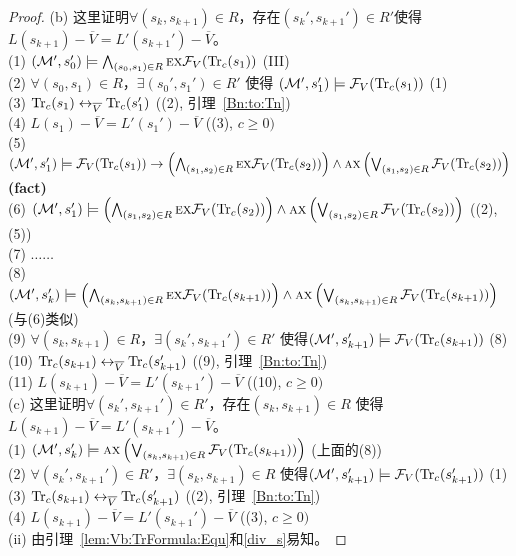 \begin{proof}
	(b) 这里证明$\forall (s_k, s_{k+1}) \in R$，存在$(s_k', s_{k+1}') \in R'$使得$L(s_{k+1}) - \overline V = L'(s_{k+1}') - \overline V$。\\
	(1) $({\cal M}', s_0') \models \bigwedge_{(s_0, s_1) \in R} \textsc{e} \textsc{x} {\cal F}_V(\textrm{Tr}_c(s_1))$  \hfill  (III)\\
	(2) $\forall (s_0, s_1) \in R$，$\exists (s_0', s_1') \in R'$ 使得 $({\cal M}', s_1') \models {\cal F}_V(\textrm{Tr}_c(s_1))$  \hfill  (1)\\
	(3) $\textrm{Tr}_c(s_1) \leftrightarrow_{\overline V} \textrm{Tr}_c(s_1')$  \hfill  ((2), 引理~\ref{Bn:to:Tn}) \\
	(4) $L(s_1) - \overline V = L'(s_1') - \overline V$  \hfill   ((3), $c \geq 0)$\\
	(5) $({\cal M}', s_1') \models {\cal F}_V(\textrm{Tr}_c(s_1)) \rightarrow \left(\bigwedge_{(s_1,s_2)\in R} \textsc{e} \textsc{x} {\cal F}_V(\textrm{Tr}_c(s_2))\right) \wedge \textsc{a} \textsc{x} \left(\bigvee_{(s_1,s_2)\in R} {\cal F}_V(\textrm{Tr}_c(s_2))\right)$     \hfill  \textbf{(fact)}\\
	(6) $({\cal M}', s_1') \models \left(\bigwedge_{(s_1,s_2)\in R} \textsc{e} \textsc{x} {\cal F}_V(\textrm{Tr}_c(s_2))\right) \wedge \textsc{a} \textsc{x} \left(\bigvee_{(s_1,s_2)\in R} {\cal F}_V(\textrm{Tr}_c(s_2))\right)$ \hfill ((2), (5))\\
	(7) $\dots \dots$ \\
	(8) $({\cal M}', s_k') \models \left(\bigwedge_{(s_k,s_{k+1})\in R} \textsc{e} \textsc{x} {\cal F}_V(\textrm{Tr}_c(s_{k+1}))\right) \wedge \textsc{a} \textsc{x} \left(\bigvee_{(s_k,s_{k+1})\in R} {\cal F}_V(\textrm{Tr}_c(s_{k+1}))\right)$       \hfill (与(6)类似)\\
	(9) $\forall (s_k, s_{k+1}) \in R$，$\exists (s_k', s_{k+1}') \in R'$ 使得$({\cal M}', s_{k+1}') \models {\cal F}_V(\textrm{Tr}_c(s_{k+1}))$  \hfill  (8)\\
	(10) $\textrm{Tr}_c(s_{k+1}) \leftrightarrow_{\overline V} \textrm{Tr}_c(s_{k+1}')$    \hfill ((9), 引理~\ref{Bn:to:Tn}) \\
	(11) $L(s_{k+1}) - \overline V = L'(s_{k+1}') - \overline V$  \hfill   ((10), $c \geq 0)$\\
	
	(c) 这里证明$\forall (s_k', s_{k+1}') \in R'$，存在$(s_k, s_{k+1})\in R$ 使得$L(s_{k+1}) - \overline V = L'(s_{k+1}') - \overline V$。\\
	(1) $({\cal M}', s_k') \models \textsc{a} \textsc{x} \left(\bigvee_{(s_k,s_{k+1})\in R} {\cal F}_V(\textrm{Tr}_c(s_{k+1}))\right)$  \hfill (上面的(8))\\
	(2) $\forall (s_k', s_{k+1}') \in R'$，$\exists (s_k, s_{k+1}) \in R$ 使得$({\cal M}', s_{k+1}') \models {\cal F}_V(\textrm{Tr}_c(s_{k+1}'))$  \hfill (1) \\
	(3) $\textrm{Tr}_c(s_{k+1}) \leftrightarrow_{\overline V} \textrm{Tr}_c(s_{k+1}')$    \hfill ((2), 引理~\ref{Bn:to:Tn}) \\
	(4) $L(s_{k+1}) - \overline V = L'(s_{k+1}') - \overline V$  \hfill   ((3), $c \geq 0)$\\
	
	(ii) 由引理~\ref{lem:Vb:TrFormula:Equ}和\ref{div_s}易知。
	
\end{proof}

